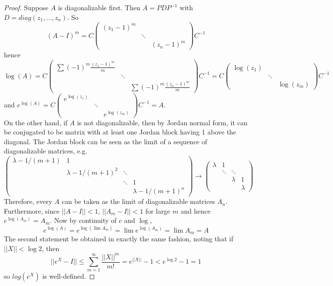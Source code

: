 \documentclass[11pt]{article}
\begin{document}
\begin{proof}
Suppose $A$ is diagonalizable first. Then $A = PDP^{-1}$ with $D = diag(z_1, \dots, z_n)$. So
$$(A-I)^m = C \left( \begin{array}{ccc}
(z_1-1)^m &  &  \\
 & \ddots &  \\
& & (z_n - 1)^m \end{array} \right)C^{-1}$$
hence
$$\log(A) = C \left( \begin{array}{ccc}
\sum (-1)^m \frac{(z_1-1)^m}{m} &  &  \\
 & \ddots &  \\
& & \sum (-1)^m \frac{(z_n - 1)^m}{m} \end{array} \right)C^{-1} = C \left( \begin{array}{ccc}
\log(z_1)  &  \\
 & \ddots &  \\
& & \log(z_m) \end{array} \right)C^{-1}$$
and $e^{\log(A)} = C \left( \begin{array}{ccc}
e^{\log(z_1)}  &  \\
 & \ddots &  \\
& & e^{\log(z_m)} \end{array} \right)C^{-1} = A$.\\
On the other hand, if $A$ is not diagonalizable, then by Jordan normal form, it can be conjugated to be matrix with at least one Jordan block having 1 above the diagonal. The Jordan block can be seen as the limit of a sequence of diagonalizable matrices, e.g.
$$\left( \begin{array}{cccc}
\lambda - 1/(m+1)  & 1 & &  \\
 & \lambda - 1/(m+1)^2 & \ddots & \\
& & \ddots & 1\\
&&& \lambda - 1/(m+1)^n \end{array} \right) \to  \left( \begin{array}{cccc}
\lambda  & 1 & &  \\
 & \ddots & \ddots & \\
& & \lambda & 1\\
&&& \lambda \end{array} \right)$$
Therefore, every $A$ can be taken as the limit of diagonalizable matrices $A_n$. Furthermore, since $||A-I||< 1$, $||A_m - I||<1$ for large $m$ and hence $e^{\log(A_m)} = A_m$. Now by continuity of $e$ and $\log$,
$$e^{\log(A)} = e^{\log(\lim A_m)} = \lim e^{\log(A_m)}  = \lim A_m = A$$
The second statement be obtained in exactly the same fashion, noting that if $||X|| < \log 2$, then
$$||e^X - I|| \leq \sum_{m = 1}^{\infty}\frac{||X||^m}{m!} = e^{||X||} - 1 < e^{\log 2} - 1 = 1$$
so $log(e^X)$ is well-defined.
\end{proof}
\end{document}

